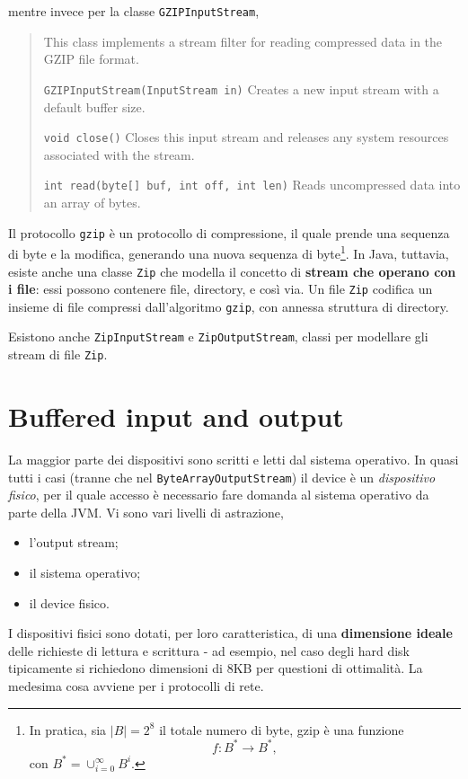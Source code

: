 \documentclass[\fontsizeclass,twocolumn]{\classname}
\theoremstyle{definition}
\theoremstyle{definition}
\begin{document}
mentre invece per la classe \texttt{GZIPInputStream},

\begin{quote}
    \footnotesize{This class implements a stream filter for reading compressed data in the GZIP file format.

        \texttt{GZIPInputStream(InputStream in)} 	Creates a new input stream with a default buffer size.

        \texttt{void 	close()} 	Closes this input stream and releases any system resources associated with the stream.

    \texttt{int 	read(byte[] buf, int off, int len)} 	Reads uncompressed data into an array of bytes.
}
\end{quote}

Il protocollo \texttt{gzip} è un protocollo di compressione, il quale prende
una sequenza di byte e la modifica, generando una nuova sequenza di
byte\footnote{In pratica, sia $|B| = 2^8$ il totale numero di byte, gzip è una
funzione $$f:B^* \rightarrow B^*,$$ con $B^* = \cup_{i=0}^{\infty} B^i$.}. In
Java, tuttavia, esiste anche una classe \texttt{Zip} che modella il concetto di
\textbf{stream che operano con i file}: essi possono contenere file,
directory, e così via. Un file \texttt{Zip} codifica un insieme di file
compressi dall'algoritmo \texttt{gzip}, con annessa struttura di directory.

Esistono anche \texttt{ZipInputStream} e \texttt{ZipOutputStream}, classi per
modellare gli stream di file \texttt{Zip}.

\chapter{Buffered input and output}

La maggior parte dei dispositivi sono scritti e letti dal sistema operativo. In
quasi tutti i casi (tranne che nel \texttt{ByteArrayOutputStream}) il device è
un \emph{dispositivo fisico}, per il quale accesso è necessario fare domanda al
sistema operativo da parte della JVM. Vi sono vari livelli di astrazione,
\begin{itemize}
    \item l'output stream;
    \item il sistema operativo;
    \item il device fisico.
\end{itemize}

I dispositivi fisici sono dotati, per loro caratteristica, di una
\textbf{dimensione ideale} delle richieste di lettura e scrittura \-- ad
esempio, nel caso degli hard disk tipicamente si richiedono dimensioni di 8KB
per questioni di ottimalità. La medesima cosa avviene per i protocolli di rete.
\end{document}

